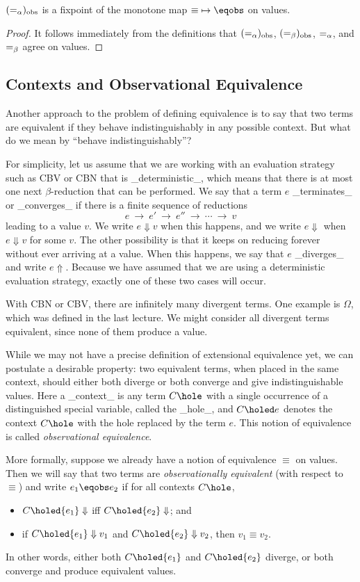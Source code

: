 \begin{theorem}
${\mathrel{(\mathrel{=_\alpha})_{\mathrm{obs}}}}$ is a fixpoint of the monotone map ${\equiv}\mapsto{\eqobs}$ on values.
\end{theorem}
\begin{proof}
It follows immediately from the definitions that ${\mathrel{(\mathrel{=_\alpha})_{\mathrm{obs}}}}$, ${\mathrel{(\mathrel{=_\beta})_{\mathrm{obs}}}}$, ${\mathrel{=_\alpha}}$, and $\mathrel{=_\beta}$ agree on values.
\end{proof}

\subsection{Contexts and Observational Equivalence}

Another approach to the problem of defining equivalence is to say that
two terms are equivalent if they behave indistinguishably in any possible context.
But what do we mean by ``behave indistinguishably''?

For simplicity, let us assume that we are working with an evaluation strategy such as CBV or CBN that is _deterministic_, which means that there is at most one next $\beta$-reduction that can be performed. We say that a term $e$ _terminates_ or _converges_ if there is a finite sequence of reductions
\[
e\ \to\ e'\ \to\ e''\ \to\ \cdots\ \to\ v
\]
leading to a value $v$. We write $e\Downarrow v$ when this happens, and we write $e\Downarrow$ when $e\Downarrow v$ for some $v$. The other possibility is that it keeps on reducing forever without ever arriving at a value. When this happens, we say that $e$ _diverges_ and write $e \Uparrow$. Because we have assumed that we are using a deterministic evaluation strategy, exactly one of these two cases will occur.

With CBN or CBV, there are infinitely many divergent terms. One example is $\Omega$, which was defined in the last lecture. 
We might consider all divergent terms equivalent, since none of them produce a value.

While we may not have a precise definition of extensional equivalence yet, we can postulate a desirable property: two equivalent terms, when placed in the same context, should either both diverge or both converge and give indistinguishable values. Here a _context_ is any term $C\hole$ with a single occurrence of a distinguished special variable, called the _hole_, and $C\holed e$ denotes the context $C\hole$ with the hole replaced by the term $e$. This notion of equivalence is called \emph{observational equivalence}.

More formally, suppose we already have a notion of equivalence $\equiv$ on values.
Then we will say that two terms are \emph{observationally equivalent} (with respect to $\equiv$) and write $e_1\eqobs e_2$ if for all contexts $C\hole$,
\begin{itemize}
\item
$C\holed{e_1} \Downarrow$ iff $C\holed{e_2} \Downarrow$; and
\item
if $C\holed{e_1} \Downarrow v_1$ and $C\holed{e_2} \Downarrow v_2$, then $v_1\equiv v_2$.
\end{itemize}
In other words, either both $C\holed{e_1}$ and $C\holed{e_2}$ diverge, or both converge and produce equivalent values.

